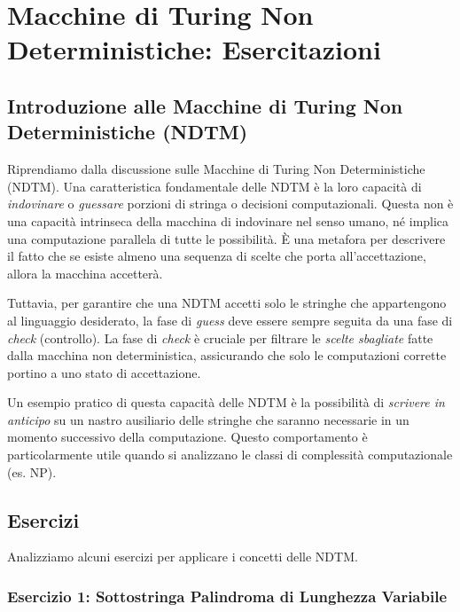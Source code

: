 \documentclass[a4paper, 11pt]{book} %
\theoremstyle{definition}
\begin{document}

\chapter{Macchine di Turing Non Deterministiche: Esercitazioni}



\section{Introduzione alle Macchine di Turing Non Deterministiche (NDTM)}

Riprendiamo dalla discussione sulle Macchine di Turing Non Deterministiche (NDTM).
Una caratteristica fondamentale delle NDTM è la loro capacità di \textit{indovinare} o \textit{guessare} porzioni di stringa o decisioni computazionali. Questa non è una capacità intrinseca della macchina di indovinare nel senso umano, né implica una computazione parallela di tutte le possibilità. È una metafora per descrivere il fatto che se esiste almeno una sequenza di scelte che porta all'accettazione, allora la macchina accetterà.

Tuttavia, per garantire che una NDTM accetti solo le stringhe che appartengono al linguaggio desiderato, la fase di \textit{guess} deve essere sempre seguita da una fase di \textit{check} (controllo). La fase di \textit{check} è cruciale per filtrare le \textit{scelte sbagliate} fatte dalla macchina non deterministica, assicurando che solo le computazioni corrette portino a uno stato di accettazione.

Un esempio pratico di questa capacità delle NDTM è la possibilità di \textit{scrivere in anticipo} su un nastro ausiliario delle stringhe che saranno necessarie in un momento successivo della computazione. Questo comportamento è particolarmente utile quando si analizzano le classi di complessità computazionale (es. NP).

\section{Esercizi}

Analizziamo alcuni esercizi per applicare i concetti delle NDTM.

\subsection{Esercizio 1: Sottostringa Palindroma di Lunghezza Variabile}
\end{document}
